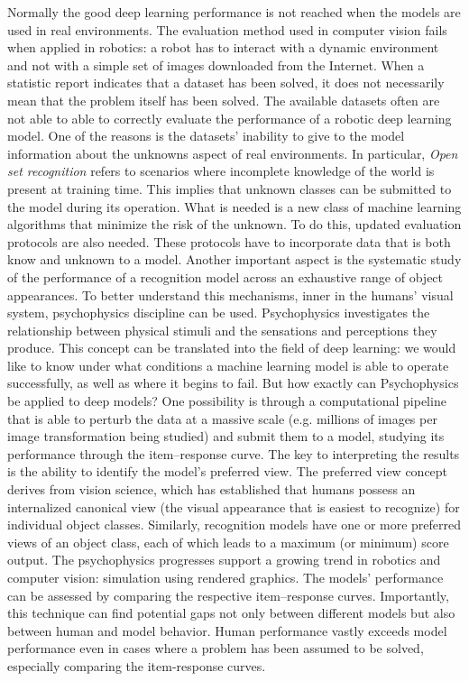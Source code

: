 Normally the good deep learning performance is not reached when the
models are used in real environments. The evaluation method used in
computer vision fails when applied in robotics: a robot has to interact
with a dynamic environment and not with a simple set of images
downloaded from the Internet. When a statistic report indicates that a
dataset has been solved, it does not necessarily mean that the problem
itself has been solved. The available datasets often are not able to
able to correctly evaluate the performance of a robotic deep learning
model. One of the reasons is the datasets' inability to give to the
model information about the unknowns aspect of real environments. In
particular, \emph{Open set recognition} refers to scenarios where
incomplete knowledge of the world is present at training time. This
implies that unknown classes can be submitted to the model during its
operation. What is needed is a new class of machine learning algorithms
that minimize the risk of the unknown. To do this, updated evaluation
protocols are also needed. These protocols have to incorporate data that
is both know and unknown to a model. Another important aspect is the
systematic study of the performance of a recognition model across an
exhaustive range of object appearances. To better understand this
mechanisms, inner in the humans' visual system, psychophysics discipline
can be used. Psychophysics investigates the relationship between
physical stimuli and the sensations and perceptions they produce. This
concept can be translated into the field of deep learning: we would like
to know under what conditions a machine learning model is able to
operate successfully, as well as where it begins to fail. But how
exactly can Psychophysics be applied to deep models? One possibility is
through a computational pipeline that is able to perturb the data at a
massive scale (e.g. millions of images per image transformation being
studied) and submit them to a model, studying its performance through
the item--response curve. The key to interpreting the results is the
ability to identify the model's preferred view. The preferred view
concept derives from vision science, which has established that humans
possess an internalized canonical view (the visual appearance that is
easiest to recognize) for individual object classes. Similarly,
recognition models have one or more preferred views of an object class,
each of which leads to a maximum (or minimum) score output. The
psychophysics progresses support a growing trend in robotics and
computer vision: simulation using rendered graphics. The models'
performance can be assessed by comparing the respective item--response
curves. Importantly, this technique can find potential gaps not only
between different models but also between human and model behavior.
Human performance vastly exceeds model performance even in cases where a
problem has been assumed to be solved, especially comparing the
item-response curves.

